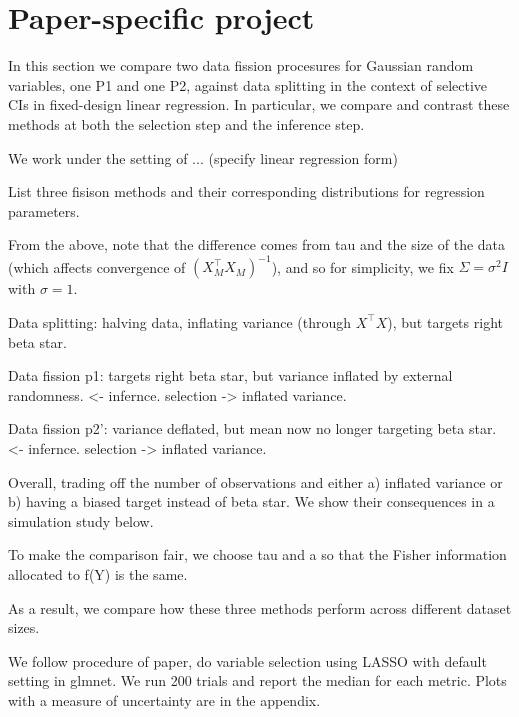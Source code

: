 \section{Paper-specific project}

In this section we compare two data fission procesures for Gaussian random variables, one P1 and one P2, against data splitting in the context of selective CIs in fixed-design linear regression. In particular, we compare and contrast these methods at both the selection step and the inference step.

We work under the setting of ... (specify linear regression form)

List three fisison methods and their corresponding distributions for regression parameters.

From the above, note that the difference comes from tau and the size of the data (which affects convergence of $(X_M^\top X_M)^{-1}$), and so for simplicity, we fix $\Sigma = \sigma^2I$ with $\sigma=1$.

Data splitting: halving data, inflating variance (through $X^\top X$), but targets right beta star.

Data fission p1: targets right beta star, but variance inflated by external randomness. <- infernce. selection -> inflated variance.

Data fission p2': variance deflated, but mean now no longer targeting beta star. <- infernce. selection -> inflated variance.

Overall, trading off the number of observations and either a) inflated variance or b) having a biased target instead of beta star. We show their consequences in a simulation study below.

To make the comparison fair, we choose tau and a so that the Fisher information allocated to f(Y) is the same.

As a result, we compare how these three methods perform across different dataset sizes.

We follow procedure of paper, do variable selection using LASSO with default setting in glmnet. We run 200 trials and report the median for each metric. Plots with a measure of uncertainty are in the appendix.

